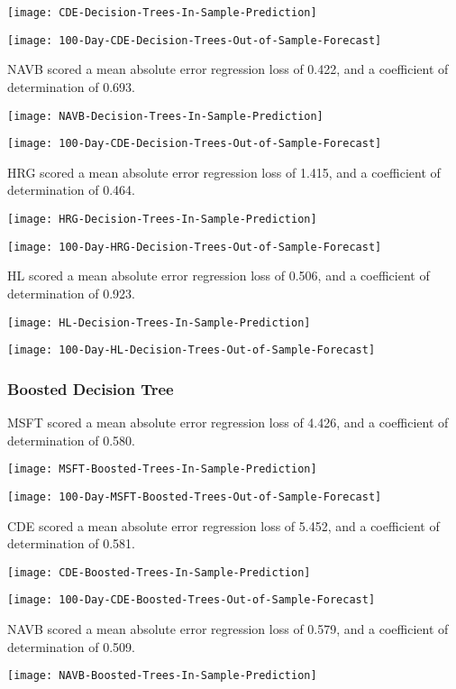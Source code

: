 \texttt{[image: CDE-Decision-Trees-In-Sample-Prediction]}

\texttt{[image: 100-Day-CDE-Decision-Trees-Out-of-Sample-Forecast]}

NAVB scored a mean absolute error regression loss of 0.422, and a coefficient of determination of 0.693.

\texttt{[image: NAVB-Decision-Trees-In-Sample-Prediction]}

\texttt{[image: 100-Day-CDE-Decision-Trees-Out-of-Sample-Forecast]}

HRG scored a mean absolute error regression loss of 1.415, and a coefficient of determination of 0.464.

\texttt{[image: HRG-Decision-Trees-In-Sample-Prediction]}

\texttt{[image: 100-Day-HRG-Decision-Trees-Out-of-Sample-Forecast]}

HL scored a mean absolute error regression loss of 0.506, and a coefficient of determination of 0.923.

\texttt{[image: HL-Decision-Trees-In-Sample-Prediction]}

\texttt{[image: 100-Day-HL-Decision-Trees-Out-of-Sample-Forecast]}

\subsubsection{Boosted Decision Tree}
MSFT scored a mean absolute error regression loss of 4.426, and a coefficient of determination of 0.580.

\texttt{[image: MSFT-Boosted-Trees-In-Sample-Prediction]}

\texttt{[image: 100-Day-MSFT-Boosted-Trees-Out-of-Sample-Forecast]}

CDE scored a mean absolute error regression loss of 5.452, and a coefficient of determination of 0.581.

\texttt{[image: CDE-Boosted-Trees-In-Sample-Prediction]}

\texttt{[image: 100-Day-CDE-Boosted-Trees-Out-of-Sample-Forecast]}

NAVB scored a mean absolute error regression loss of 0.579, and a coefficient of determination of 0.509.

\texttt{[image: NAVB-Boosted-Trees-In-Sample-Prediction]}

